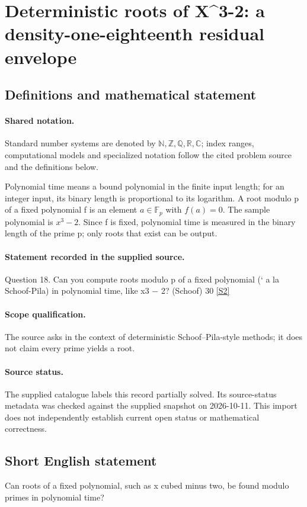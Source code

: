 \documentclass[11pt]{article}
\newcommand{\sref}[2]{\hyperlink{source:#1:#2}{[S#2]}}
\begin{document}
\section{Deterministic roots of X\textasciicircum{}3-2: a density-one-eighteenth residual envelope}\label{statement}

\subsection{Definitions and mathematical statement}

\paragraph{Shared notation.}Standard number systems are denoted by $\mathbb N,\mathbb Z,\mathbb Q,\mathbb R,\mathbb C$; index ranges, computational models and specialized notation follow the cited problem source and the definitions below.


Polynomial time means a bound polynomial in the finite input length; for an integer input, its binary length is proportional to its logarithm. A root modulo p of a fixed polynomial f is an element $a\in\mathbb F_p$ with $f(a)=0$. The sample polynomial is $x^3-2$. Since f is fixed, polynomial time is measured in the binary length of the prime p; only roots that exist can be output.
\paragraph{Statement recorded in the supplied source.}
Question 18. Can you compute roots modulo p of a fixed polynomial (` a la Schoof-Pila) in polynomial time, like x3 − 2? (Schoof) 30 \sref{statement}{2}
\paragraph{Scope qualification.}
The source asks in the context of deterministic Schoof--Pila-style methods; it does not claim every prime yields a root.
\paragraph{Source status.}
The supplied catalogue labels this record partially solved. Its source-status metadata was checked against the supplied snapshot on 2026-10-11. This import does not independently establish current open status or mathematical correctness.
\subsection{Short English statement}
Can roots of a fixed polynomial, such as x cubed minus two, be found modulo primes in polynomial time?
\end{document}
